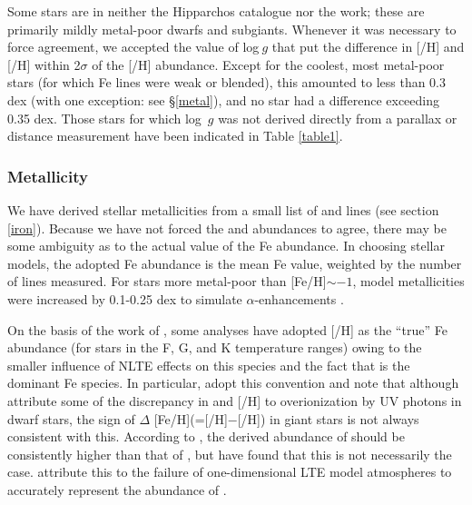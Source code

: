 \documentclass[12pt,preprint]{aastex}
\begin{document}
Some stars are in neither the Hipparchos catalogue nor the \citet{Twarog1994} work; these are primarily mildly metal-poor dwarfs and subgiants.  Whenever it was necessary to force agreement, we accepted the value of log$~g$ that put the difference in [/H] and [/H] within 2$\sigma$ of the  [/H] abundance.  Except for the coolest, most metal-poor stars (for which Fe lines were weak or blended), this amounted to less than 0.3 dex (with one exception: see \S \ref{metal}), and no star had a difference exceeding 0.35 dex.  Those stars for which log~$g$ was not derived directly from a parallax or distance measurement have been indicated in Table \ref{table1}.  

\subsubsection{Metallicity \label{metal}}
We have derived stellar metallicities from a small list of  and  lines (see section \ref{iron}).  Because we have not forced the  and  abundances to agree, there may be some ambiguity as to the actual value of the Fe abundance.  In choosing stellar models, the adopted Fe abundance is the mean Fe value, weighted by the number of lines measured.  For stars more metal-poor than [Fe/H]$\sim -1$, model metallicities were increased by 0.1-0.25 dex to simulate $\alpha$-enhancements \citep{Fulbright1999}.  

On the basis of the work of \citet{Thevenin1999}, some analyses have adopted [/H] as the ``true'' Fe abundance (for stars in the F, G, and K temperature ranges) owing to the smaller influence of NLTE effects on this species and the fact that  is the dominant Fe species. In particular, \citet{Kraft2003} adopt this convention and note that although \citet{Thevenin1999} attribute some of the discrepancy in  and [/H] to overionization by UV photons in dwarf stars, the sign of $\Delta$ [Fe/H](=[/H]$-$[/H]) in giant stars is not always consistent with this.  According to \citet{Thevenin1999}, the derived abundance of  should be consistently higher than that of , but \citet{Kraft2003} have found that this is not necessarily the case.  \citet{Kraft2003} attribute this to the failure of one-dimensional LTE model atmospheres to accurately represent the abundance of . 
\end{document}
